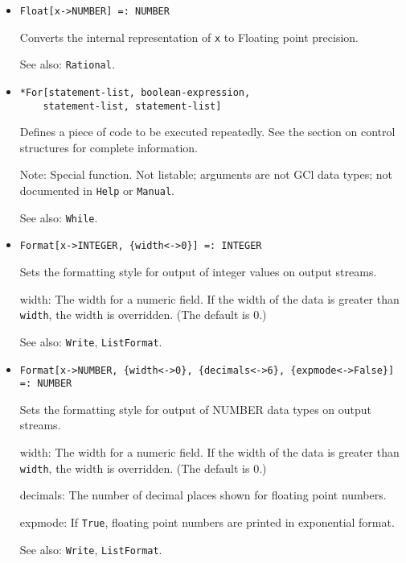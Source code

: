 \begin{itemize}
\item{}
\protect \large \begin{verbatim}
Float[x->NUMBER] =: NUMBER
\end{verbatim} \normalsize

\bd Converts the internal representation of \verb+x+ to Floating point
precision.
\item [See also:] \verb+Rational+.
\ed

\item{}
\protect \large \begin{verbatim}
*For[statement-list, boolean-expression, 
    statement-list, statement-list]
\end{verbatim}\normalsize

\bd
Defines a piece of code to be executed repeatedly.  See the section
on control structures for complete information.
\item [Note:] Special function.  Not listable; arguments are not GCl
data types; not documented in \verb+Help+ or \verb+Manual+.  
\item
[See also:] \verb+While+.
\ed

\item{}
\protect \large \begin{verbatim}
Format[x->INTEGER, {width<->0}] =: INTEGER 
\end{verbatim} \normalsize

\bd 
Sets the formatting style for output of integer values on
output streams.
\bd
\item [width:] The width for a numeric field.  If the width of the
data is greater than \verb+width+, the width is overridden.  (The
default is 0.)
\ed
\item [See also:] \verb+Write+, \verb+ListFormat+.
\ed


\item{}
\protect \large \begin{verbatim}
Format[x->NUMBER, {width<->0}, {decimals<->6}, {expmode<->False}] =: NUMBER 
\end{verbatim} \normalsize

\bd
Sets the formatting style for output of NUMBER data types on output streams.
\bd
\item [width:] The width for a numeric field.  If the width of the
data is greater than \verb+width+, the width is overridden.  (The
default is 0.)
\item [decimals:] The number of decimal places shown for floating point
numbers.
\item [expmode:] If \verb+True+, floating point numbers are printed in
exponential format.
\ed
\item [See also:] \verb+Write+, \verb+ListFormat+.
\ed


\end{itemize}
